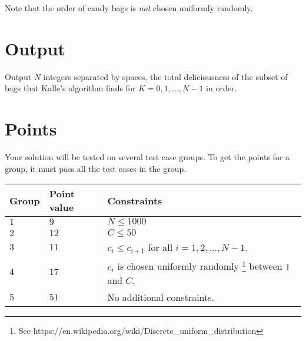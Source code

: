 Note that the order of candy bags is \textit{not} chosen uniformly randomly. 


\section*{Output}
Output $N$ integers separated by spaces, the total deliciousness of the subset of bags that Kalle's
algorithm finds for $K=0,1,\dots,N-1$ in order. 

\section*{Points}
Your solution will be tested on several test case groups.
To get the points for a group, it must pass all the test cases in the group.

\noindent
\begin{tabular}{| l | l | p{12cm} |}
  \hline
  \textbf{Group} & \textbf{Point value} & \textbf{Constraints} \\ \hline
  $1$    & $9$        & $N \leq 1000$ \\ \hline
  $2$    & $12$       & $C \leq 50$ \\ \hline
  $3$    & $11$       & $c_i \leq c_{i+1}$ for all $i=1,2,\dots,N-1$. \\ \hline
  $4$    & $17$       & $c_i$ is chosen uniformly randomly \footnote{See https://en.wikipedia.org/wiki/Discrete\_uniform\_distribution} between $1$ and $C$. \\ \hline
  $5$    & $51$       & No additional constraints. \\ \hline
\end{tabular}

